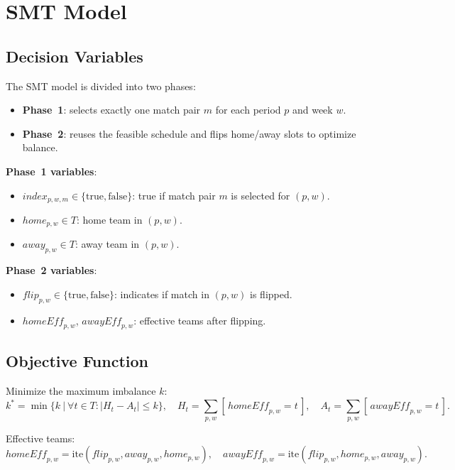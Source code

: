 \section{SMT Model}

\subsection{Decision Variables}

The SMT model is divided into two phases:

\begin{itemize}
    \item \textbf{Phase~1}: selects exactly one match pair $m$ for each period $p$ and week $w$.
    \item \textbf{Phase~2}: reuses the feasible schedule and flips home/away slots to optimize balance.
\end{itemize}

\textbf{Phase~1 variables}:
\begin{itemize}
    \item $\mathit{index}_{p,w,m} \in \{\text{true}, \text{false}\}$: true if match pair $m$ is selected for $(p,w)$.
    \item $\mathit{home}_{p,w} \in T$: home team in $(p,w)$.
    \item $\mathit{away}_{p,w} \in T$: away team in $(p,w)$.
\end{itemize}

\textbf{Phase~2 variables}:
\begin{itemize}
    \item $\mathit{flip}_{p,w} \in \{\text{true}, \text{false}\}$: indicates if match in $(p,w)$ is flipped.
    \item $\mathit{homeEff}_{p,w}$, $\mathit{awayEff}_{p,w}$: effective teams after flipping.
\end{itemize}

\subsection{Objective Function}

Minimize the maximum imbalance $k$:
\[
k^* = \min \Big\{ k ~|~ \forall t \in T: |H_t - A_t| \leq k \Big\},
\quad 
H_t = \sum_{p,w} [\, \mathit{homeEff}_{p,w} = t\,], \quad 
A_t = \sum_{p,w} [\, \mathit{awayEff}_{p,w} = t\,].
\]

Effective teams:
\[
\mathit{homeEff}_{p,w} = \text{ite}(\mathit{flip}_{p,w}, \mathit{away}_{p,w}, \mathit{home}_{p,w}), 
\quad
\mathit{awayEff}_{p,w} = \text{ite}(\mathit{flip}_{p,w}, \mathit{home}_{p,w}, \mathit{away}_{p,w}).
\]

